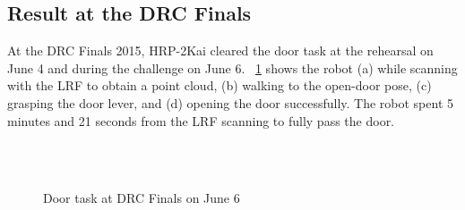 \subsection{Result at the DRC Finals}
%
At the DRC Finals 2015, HRP-2Kai cleared the door task at the rehearsal on June 4 and during
the challenge on June 6.
\figurename~\ref{fig:drc_door_aist_day2} shows the robot (a) while scanning with the LRF to
obtain a point cloud, (b) walking to the open-door pose, (c) grasping the door lever,
and (d) opening the door successfully.
The robot spent 5 minutes and 21 seconds from the LRF scanning to fully pass the door.
%
\begin{figure}[t]
	\centering
	\quad
	\\
	\quad
	\\
	\caption{Door task at DRC Finals on June 6~\cite{DARPA}}
	\label{fig:drc_door_aist_day2}
\end{figure}


